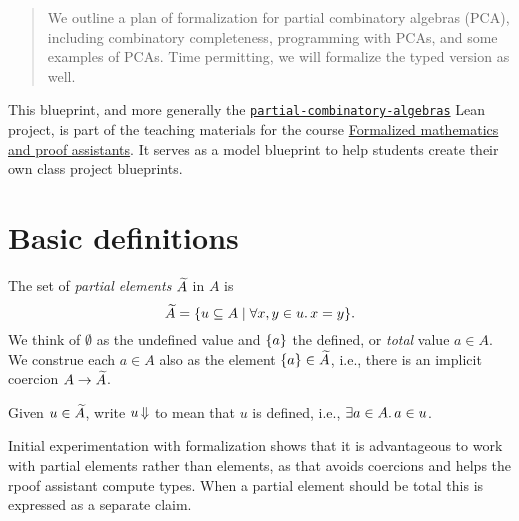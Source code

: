 %

\begin{abstract}
  We outline a plan of formalization for partial combinatory algebras (PCA), including combinatory completeness,
  programming with PCAs, and some examples of PCAs. Time permitting, we will formalize the typed version as well.
\end{abstract}


This blueprint, and more generally the \href{https://github.com/andrejbauer/partial-combinatory-algebras}{\texttt{partial-combinatory-algebras}} Lean project, is part of the teaching materials for the course \href{https://www.andrej.com/zapiski/MAT-FORMATH-2024/book/}{Formalized mathematics and proof assistants}.
It serves as a model blueprint to help students create their own class project blueprints.

\section{Basic definitions}

The set of \emph{partial elements} $\widetilde{A}$ in $A$ is
%
\begin{equation*}
  \widetilde{A} = \{ u \subseteq A \mid \forall x, y \in u.\, x = y\}.
\end{equation*}
%
We think of $\emptyset$ as the undefined value and $\{a\}$ the defined, or \emph{total} value $a \in A$.
We construe each $a \in A$ also as the element $\{a\} \in \widetilde{A}$, i.e., there is an implicit coercion $A \to \widetilde{A}$.

Given $u \in \widetilde{A}$, write $u\,{\Downarrow}$ to mean that $u$ is defined, i.e., $\exists a \in A.\, a \in u$.

Initial experimentation with formalization shows that it is advantageous to work with partial elements rather than elements, as that avoids coercions and helps the rpoof assistant compute types. When a partial element should be total this is expressed as a separate claim.

